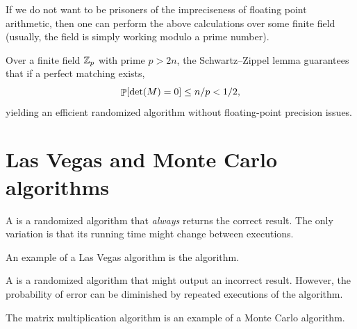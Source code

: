 If we do not want to be prisoners of the impreciseness of floating
point arithmetic, then one can perform the above calculations over
some finite field (usually, the field is simply working modulo a prime
number).

\begin{remark}
    Over a finite field $\mathbb{Z}_p$ with prime $p > 2n$, the Schwartz--Zippel
    lemma guarantees that if a perfect matching exists,
    \begin{equation*}
        \Prob{\det(M) = 0} \leq n/p < 1/2,
    \end{equation*}
    yielding an efficient randomized algorithm without floating-point
    precision issues.
\end{remark}


\section{Las Vegas and Monte Carlo algorithms}

\begin{defn}
    A  is a
    randomized algorithm that {\em always} returns the correct result.
    The only variation is that its running time might change between
    executions.
\end{defn}

An example of a Las Vegas algorithm is the 
algorithm.

\begin{defn}
    A 
    is a randomized algorithm that might output an incorrect result.
    However, the probability of error can be diminished by repeated
    executions of the algorithm.
\end{defn}

The matrix multiplication algorithm is an example of a Monte Carlo
algorithm.



